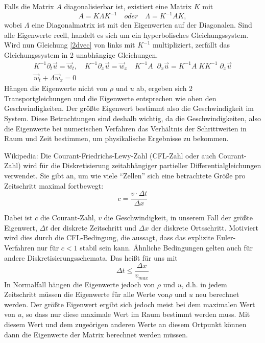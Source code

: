 Falls die Matrix $A$ diagonalisierbar ist, existiert eine Matrix $K$ mit
\begin{equation}
A = K \Lambda K^{-1} \quad oder \quad \Lambda = K^{-1} A K,
\end{equation}
wobei $\Lambda$ eine Diagonalmatrix ist mit den Eigenwerten auf der
Diagonalen. Sind alle Eigenwerte reell, handelt es sich um ein
hyperbolisches Gleichungssystem. Wird nun Gleichung \ref{2dvec} von
links mit $K^{-1}$ multipliziert, zerfällt das Gleichungssystem in 2
unabhängige Gleichungen.
\begin{eqnarray}
&K^{-1}\partial_t\vec{u} = \vec{w}_t,\quad K^{-1}\partial_x\vec{u} = \vec{w}_x
\quad K^{-1} A\;\; \partial_x \vec{u} = K^{-1}A\; K K^{-1}\;\partial_x \vec{u}
& \\
&\vec{w}_t + \Lambda \vec{w}_x = 0 &\nonumber  
\end{eqnarray}
Hängen die Eigenwerte nicht von $\rho$ und $u$ ab, ergeben sich 2
Transportgleichungen und die Eigenwerte entsprechen wie oben den
Geschwindigkeiten. Der größte Eigenwert bestimmt also die
Geschwindigkeit im System.  Diese Betrachtungen sind deshalb wichtig,
da die Geschwindigkeiten, also die Eigenwerte bei numerischen
Verfahren das Verhältnis der Schrittweiten in Raum und Zeit bestimmen,
um physikalische Ergebnisse zu bekommen.

Wikipedia: Die Courant-Friedrichs-Lewy-Zahl (CFL-Zahl oder auch
Courant-Zahl) wird für die Diskretisierung zeitabhängiger partieller
Differentialgleichungen verwendet. Sie gibt an, um wie viele ``Zellen''
sich eine betrachtete Größe pro Zeitschritt maximal fortbewegt:
\begin{equation}
  c = \frac{v \cdot \Delta t}{\Delta x} \label{eq:cfl}
\end{equation}

Dabei ist $c$ die Courant-Zahl, $v$ die Geschwindigkeit, in unserem
Fall der größte Eigenwert, $\Delta t$ der diskrete Zeitschritt und
$\Delta x$ der diskrete Ortsschritt. Motiviert wird dies durch die
CFL-Bedingung, die aussagt, dass das explizite Euler-Verfahren nur für
$c<1$ stabil sein kann. Ähnliche Bedingungen gelten auch für andere
Diskretisierungsschemata. Das heißt für uns mit
\begin{equation}
\Delta t \leq \frac{\Delta x}{v_{max}}
\end{equation}
In Normalfall hängen die Eigenwerte jedoch von $\rho$ und $u$, d.h. in
jedem Zeitschritt müssen die Eigenwerte für alle Werte von$\rho$ und
$u$ neu berechnet werden. Der größte Eigenwert ergibt sich jedoch
meist bei dem maximalen Wert von $u$, so dass nur diese maximale Wert
im Raum bestimmt werden muss. Mit diesem Wert und dem zugeörigen
anderen Werte an diesem Ortpunkt können dann die Eigenwerte der Matrix
berechnet werden müssen.









